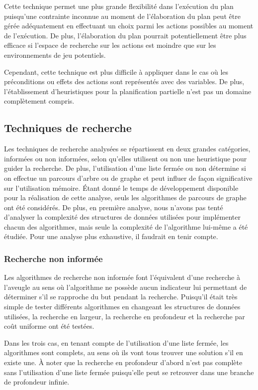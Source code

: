 \documentclass[12pt,english,frenchb,letterpaper]{article}
\begin{document}
Cette technique permet une plus grande flexibilité dans l'exécution du plan puisqu'une contrainte inconnue au moment de l'élaboration du plan peut être gérée adéquatement en effectuant un choix parmi les actions possibles au moment de l'exécution.  De plus, l'élaboration du plan pourrait potentiellement être plus efficace si l'espace de recherche sur les actions est moindre que sur les environnements de jeu potentiels.

Cependant, cette technique est plus difficile à appliquer dans le cas où les préconditions ou effets des actions sont représentés avec des variables.  De plus, l'établissement d'heuristiques pour la planification partielle n'est pas un domaine complètement compris.

\subsection{Techniques de recherche}
Les techniques de recherche analysées se répartissent en deux grandes catégories, informées ou non informées, selon qu'elles utilisent ou non une heuristique pour guider la recherche.  De plus, l'utilisation d'une liste fermée ou non détermine si on effectue un parcours d'arbre ou de graphe et peut influer de fa\c con significative sur l'utilisation mémoire.  Étant donné le temps de développement disponible pour la réalisation de cette analyse, seuls les algorithmes de parcours de graphe ont été considérés.  De plus, en première analyse, nous n'avons pas tenté d'analyser la complexité des structures de données utilisées pour implémenter chacun des algorithmes, mais seule la complexité de l'algorithme lui-même a été étudiée.  Pour une analyse plus exhaustive, il faudrait en tenir compte.

\subsubsection{Recherche non informée}
Les algorithmes de recherche non informée font l'équivalent d'une recherche à l'aveugle au sens où l'algorithme ne possède aucun indicateur lui permettant de déterminer s'il se rapproche du but pendant la recherche.  Puisqu'il était très simple de tester différents algorithmes en changeant les structures de données utilisées, la recherche en largeur, la recherche en profondeur et la recherche par coût uniforme ont été testées.

Dans les trois cas, en tenant compte de l'utilisation d'une liste fermée, les algorithmes sont complets, au sens où ils vont tous trouver une solution s'il en existe une. À noter que la recherche en profondeur d'abord n'est pas complète sans l'utilisation d'une liste fermée puisqu'elle peut se retrouver dans une branche de profondeur infinie.
\end{document}
